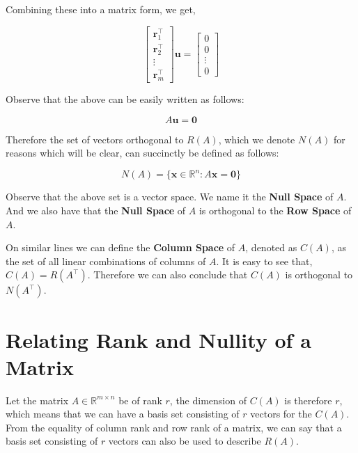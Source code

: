 \documentclass[a4paper]{article}
\begin{document}
Combining these into a matrix form, we get,

\begin{equation}
\begin{bmatrix}
\boldsymbol{r}_1^{\top}\\
\boldsymbol{r}_2^{\top}\\
\vdots\\
\boldsymbol{r}_m^{\top}
\end{bmatrix} \boldsymbol{u} = \begin{bmatrix}
0\\
0\\
\vdots\\
0
\end{bmatrix}
\end{equation}

Observe that the above can be easily written as follows:

\begin{equation}
A\boldsymbol{u} = \boldsymbol{0}
\end{equation}

Therefore the set of vectors orthogonal to $R(A)$, which we denote $N(A)$ for reasons which will be clear, can succinctly be defined as follows:

\begin{equation}
N(A) = \{\boldsymbol{x} \in \mathbb{R}^n: A\boldsymbol{x}=\boldsymbol{0}\}
\end{equation}

Observe that the above set is a vector space. We name it the \textbf{Null Space} of $A$. And we also have that the \textbf{Null Space} of $A$ is orthogonal to the \textbf{Row Space} of $A$. 

On similar lines we can define the \textbf{Column Space} of $A$, denoted as $C(A)$, as the set of all linear combinations of columns of $A$. It is easy to see that, $C(A) = R(A^{\top})$. Therefore we can also conclude that $C(A)$ is orthogonal to $N(A^{\top})$.

\bigskip

\section{Relating Rank and Nullity of a Matrix}


Let the matrix $A \in \mathbb{R}^{m \times n}$ be of rank $r$, the dimension of $C(A)$ is therefore $r$, which means that we can have a basis set consisting of $r$ vectors for the $C(A)$. From the equality of column rank and row rank of a matrix, we can say that a basis set consisting of $r$ vectors can also be used to describe $R(A)$.
\end{document}
